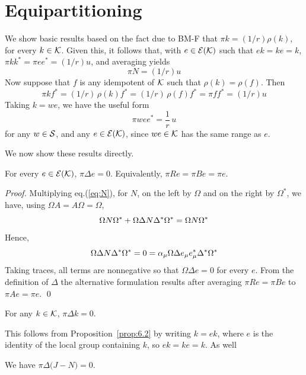 
\section{Equipartitioning}
\label{sec:6.5}


We show basic results based on the fact due to BM-F 
that $\pi k=(1/r)\rho(k)$, for every $k\in{\mathcal K}$. Given this, it follows that, with $e\in {\mathcal E }({\mathcal K})$ such that
$ek=ke=k$, $\pi kk^*=\pi ee^*=(1/r)u$, and averaging yields 
$$
  \pi N = (1/r) u
$$
Now suppose that $f$ is any idempotent of ${\mathcal K}$ such that $\rho(k)=\rho(f)$. Then 
$$
  \pi kf^*=(1/r)\,\rho(k) f^*=(1/r)\,
  \rho(f) f^*=\pi ff^*=(1/r)u
$$ 
Taking $k=we$, we have the useful form
$$
  \pi w ee^*=\frac{1}{r}\,u
$$
for any $w\in{\mathcal S}$, and any $e\in {\mathcal E }({\mathcal K})$, since $we\in{\mathcal K}$ has the same range as $e$.

We now show these results directly.

\begin{proposition} 	\label{prop:6.2}
For every $e\in{\mathcal E }({\mathcal K})$, $\pi\Delta e=0$. Equivalently, $\pi Re=\pi Be=\pi e$.
\end{proposition}

\begin{proof} Multiplying eq.\tsp(\ref{eq:N}), for $N$,
 on the left by $\Omega$ and on the right by $\Omega^*$, we have,
using $\Omega A=A\Omega=\Omega$,
$$
  {\Omega}{N}{\Omega}^*+\Omega{\Delta}{N}{\Delta}^*\Omega^*
	={\Omega}{N}{\Omega}^*
$$
Hence,
$$
  \Omega{\Delta}{N}{\Delta}^*\Omega^*=0
	=\alpha_\mu\Omega\Delta e_\mu e_\mu^*\Delta^*\Omega^*
$$
Taking traces, all terms are nonnegative so that $\Omega\Delta e=0$ for every $e$. From the definition of $\Delta$ the alternative
formulation results after averaging $\pi Re=\pi Be$ to $\pi Ae=\pi e$.  \qed
\end{proof}\label{proppidelta}

\begin{corollary} 	\label{cor:6.1}\label{ch5:kernel-delta}
For any $k\in{\mathcal K}$, $\pi\Delta k =0$.
\end{corollary}

This follows from Proposition~\ref{prop:6.2} by writing $k=ek$, where $e$ is the identity of the local group containing $k$, so $ek=ke=k$. As well

\begin{corollary} \label{cor:pideltan}  \label{cor:6.2}
We have $\pi\Delta \bigl(J-N\bigr) =0$.
\end{corollary}

